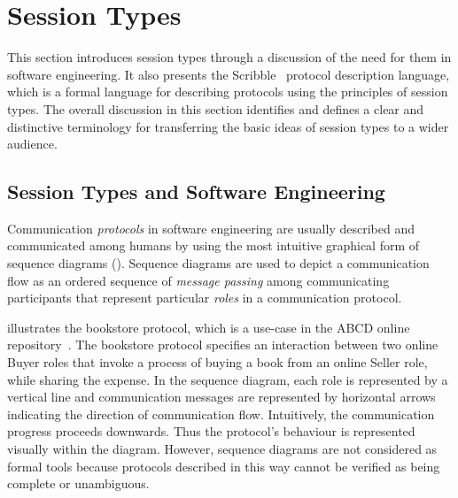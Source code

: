 
\section{Session Types}
\label{sec:session_types}


This section introduces session types through 
a discussion of the need for them in
software engineering.
It also presents the Scribble~\cite{scribble} protocol
description language, which is a formal language for describing
protocols using the principles of session types.
The overall discussion in this section identifies and defines
a clear and distinctive terminology 
for transferring the basic ideas of session
types to a wider audience.

\subsection{Session Types and Software Engineering}%
\label{sec:sessions_software}



Communication \emph{protocols} in software engineering
are usually described and communicated among humans
by using the most intuitive graphical form of sequence diagrams 
().
Sequence diagrams are used to depict a communication flow as an ordered
sequence of \emph{message passing} among communicating
participants that represent particular \emph{roles} in a communication
protocol.

 illustrates the bookstore protocol, which is a use-case
in the ABCD online repository~\cite{usecase_repository}.
The bookstore protocol specifies an interaction between two online Buyer roles
that invoke a process of buying a book from an online Seller role, while
sharing the expense.
In the sequence diagram, each role is represented by a vertical line and
communication messages are represented by horizontal arrows
indicating the direction of communication flow.
Intuitively, the communication progress proceeds downwards.
Thus the protocol's behaviour is represented visually within the diagram.
However, sequence diagrams are not considered as formal tools because
protocols described in this way cannot be verified as being complete or unambiguous.

